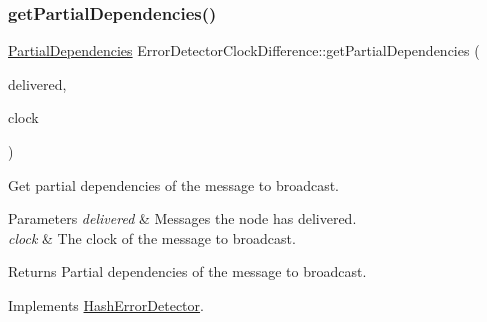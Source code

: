 \mbox{\label{class_error_detector_clock_difference_a26f4c2905859947201d0a18146f2e961}} 
\subsubsection{\texorpdfstring{get\+Partial\+Dependencies()}{getPartialDependencies()}}
{\footnotesize\ttfamily \hyperlink{class_partial_dependencies}{Partial\+Dependencies} Error\+Detector\+Clock\+Difference\+::get\+Partial\+Dependencies (\begin{DoxyParamCaption}\item[{const vector$<$ \hyperlink{structures_8h_a7e7bdc1d2fff8a9436f2f352b2711ed6}{message\+Info} $>$ \&}]{delivered,  }\item[{const \hyperlink{class_probabilistic_clock}{Probabilistic\+Clock} \&}]{clock }\end{DoxyParamCaption})\hspace{0.3cm}{\ttfamily [virtual]}}



Get partial dependencies of the message to broadcast. 


\begin{DoxyParams}{Parameters}
{\em delivered} & Messages the node has delivered. \\
\hline
{\em clock} & The clock of the message to broadcast. \\
\hline
\end{DoxyParams}
\begin{DoxyReturn}{Returns}
Partial dependencies of the message to broadcast. 
\end{DoxyReturn}


Implements \hyperlink{class_hash_error_detector_a5b9f7e8a6f63b1582e912102021c2d8d}{Hash\+Error\+Detector}.

\mbox{\label{class_error_detector_clock_difference_a4d399849b1872d3273fa757ee9dc9bd9}} 
